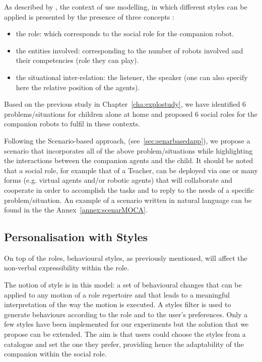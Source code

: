 \documentclass[smallextended]{svjour3}
\begin{document}
As described by \cite{Coutaz2012}, the context of use modelling, in which different styles can be applied is presented by the presence of three concepts :
\begin{itemize}[noitemsep,nolistsep]
\item the role: which corresponds to the social role for the companion robot.
\item the entities involved: corresponding to the number of robots involved and their competencies (role they can play).
\item the situational inter-relation: the listener, the speaker (one can also specify here the relative position of the agents).
\end{itemize}
Based on the previous study in Chapter~\ref{cha:explostudy}, we have identified 6 problems/situations for children alone at home and proposed 6 social roles for the companion robots to fulfil in these contexts.

Following the Scenario-based approach, (see~\ref{sec:senarbasedapp}), we propose a scenario that incorporates all of the above problem/situations while highlighting the interactions between the companion agents and the child. 
It should be noted that a social role, for example that of a Teacher, can be deployed via one or many forms (e.g. virtual agents and/or robotic agents) that will collaborate and cooperate in order to accomplish the tasks and to reply to the needs of a specific problem/situation.
An example of a scenario written in natural language can be found in the the Annex~\ref{annex:scenarMOCA}.




\subsection{Personalisation with Styles}
On top of the roles, behavioural styles, as previously mentioned, will affect the non-verbal expressibility within the role.

The notion of style is in this model: a set of behavioural changes that can be applied to any motion of a role repertoire and that leads to a meaningful interpretation of the way the motion is executed. 
A styles filter is used to generate behaviours according to the role and to the user's preferences. 
Only a few styles have been implemented for our experiments but the solution that we propose can be extended.
The aim is that users could choose the styles from a catalogue and set the one they prefer, providing hence the adaptability of the companion within the social role. 
\end{document}

